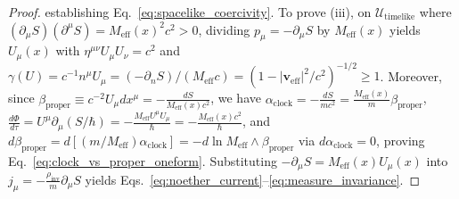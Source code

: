 \documentclass[11pt, a4paper]{article}
\theoremstyle{definition}
\begin{document}
\begin{proof}
establishing Eq.~\eqref{eq:spacelike_coercivity}. To prove (iii), on $\mathcal{U}_{\text{timelike}}$ where $(\partial_\mu S)(\partial^\mu S) = M_{\text{eff}}(x)^2 c^2 > 0$, dividing $p_\mu = -\partial_\mu S$ by $M_{\text{eff}}(x)$ yields $U_\mu(x)$ with $\eta^{\mu\nu}U_\mu U_\nu = c^2$ and $\gamma(U) = c^{-1}n^\mu U_\mu = (-\partial_n S)/(M_{\text{eff}}c) = (1 - |\mathbf{v}_{\text{eff}}|^2/c^2)^{-1/2} \ge 1$. Moreover, since $\beta_{\text{proper}} \equiv c^{-2}U_\mu dx^\mu = -\frac{dS}{M_{\text{eff}}(x)c^2}$, we have $\alpha_{\text{clock}} = -\frac{dS}{mc^2} = \frac{M_{\text{eff}}(x)}{m}\beta_{\text{proper}}$, $\frac{d\Phi}{d\tau} = U^\mu\partial_\mu(S/\hbar) = -\frac{M_{\text{eff}}U^\mu U_\mu}{\hbar} = -\frac{M_{\text{eff}}(x)c^2}{\hbar}$, and $d\beta_{\text{proper}} = d[(m/M_{\text{eff}})\alpha_{\text{clock}}] = -d\ln M_{\text{eff}}\wedge\beta_{\text{proper}}$ via $d\alpha_{\text{clock}} = 0$, proving Eq.~\eqref{eq:clock_vs_proper_oneform}. Substituting $-\partial_\mu S = M_{\text{eff}}(x) U_\mu(x)$ into $j_\mu = -\frac{\rho_{\text{inv}}}{m}\partial_\mu S$ yields Eqs.~\eqref{eq:noether_current}--\eqref{eq:measure_invariance}.
\end{proof}
\end{document}
